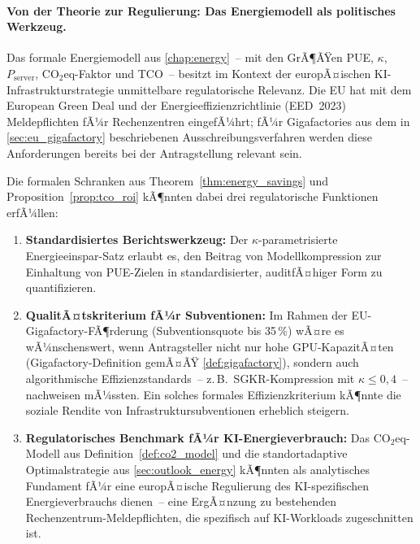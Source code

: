 ﻿\documentclass[12pt, a4paper, openany]{report}
\begin{document}
\paragraph{Von der Theorie zur Regulierung: Das Energiemodell als
  politisches Werkzeug.}
Das formale Energiemodell aus \cref{chap:energy}~-- mit den GrÃ¶ÃŸen
PUE, $\kappa$, $P_{\mathrm{server}}$, CO$_2$eq-Faktor und TCO~--
besitzt im Kontext der europÃ¤ischen KI-Infrastrukturstrategie
unmittelbare regulatorische Relevanz.  Die EU hat mit dem European
Green Deal und der Energieeffizienzrichtlinie (EED~2023) Meldepflichten
fÃ¼r Rechenzentren eingefÃ¼hrt; fÃ¼r Gigafactories aus dem in
\cref{sec:eu_gigafactory} beschriebenen Ausschreibungsverfahren werden
diese Anforderungen bereits bei der Antragstellung relevant sein.

Die formalen Schranken aus Theorem~\ref{thm:energy_savings} und
Proposition~\ref{prop:tco_roi} kÃ¶nnten dabei drei regulatorische
Funktionen erfÃ¼llen:
\begin{enumerate}[label=(\roman*)]
  \item \textbf{Standardisiertes Berichtswerkzeug:} Der
    $\kappa$-parametrisierte Energieeinspar-Satz erlaubt es, den
    Beitrag von Modellkompression zur Einhaltung von PUE-Zielen in
    standardisierter, auditfÃ¤higer Form zu quantifizieren.
  \item \textbf{QualitÃ¤tskriterium fÃ¼r Subventionen:} Im Rahmen der
    EU-Gigafactory-FÃ¶rderung (Subventionsquote bis 35\,\%) wÃ¤re es
    wÃ¼nschenswert, wenn Antragsteller nicht nur hohe GPU-KapazitÃ¤ten
    (Gigafactory-Definition gemÃ¤ÃŸ \cref{def:gigafactory}), sondern auch
    algorithmische Effizienzstandards~-- z.\,B.\ SGKR-Kompression mit
    $\kappa \leq 0{,}4$~-- nachweisen mÃ¼ssten.  Ein solches formales
    Effizienzkriterium kÃ¶nnte die soziale Rendite von
    Infrastruktursubventionen erheblich steigern.
  \item \textbf{Regulatorisches Benchmark fÃ¼r KI-Energieverbrauch:}
    Das CO$_2$eq-Modell aus Definition~\ref{def:co2_model} und die
    standortadaptive Optimalstrategie aus \cref{sec:outlook_energy}
    kÃ¶nnten als analytisches Fundament fÃ¼r eine europÃ¤ische
    Regulierung des KI-spezifischen Energieverbrauchs dienen~-- eine
    ErgÃ¤nzung zu bestehenden Rechenzentrum-Meldepflichten, die
    spezifisch auf KI-Workloads zugeschnitten ist.
\end{enumerate}
\end{document}
